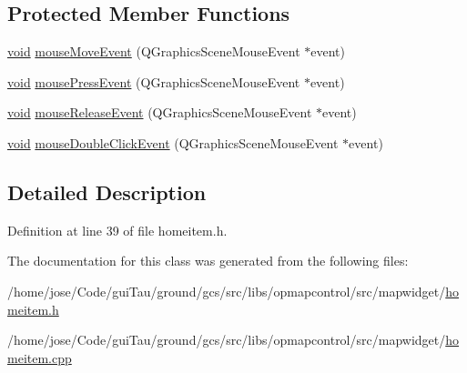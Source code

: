 \subsection*{Protected Member Functions}
\begin{DoxyCompactItemize}
\item 
\hyperlink{group___u_a_v_objects_plugin_ga444cf2ff3f0ecbe028adce838d373f5c}{void} \hyperlink{group___o_p_map_widget_ga547e723911d9f309c53c587dae90002a}{mouse\-Move\-Event} (Q\-Graphics\-Scene\-Mouse\-Event $\ast$event)
\item 
\hyperlink{group___u_a_v_objects_plugin_ga444cf2ff3f0ecbe028adce838d373f5c}{void} \hyperlink{group___o_p_map_widget_ga312ac9d1cba702ca33ba3f6fbc883bb1}{mouse\-Press\-Event} (Q\-Graphics\-Scene\-Mouse\-Event $\ast$event)
\item 
\hyperlink{group___u_a_v_objects_plugin_ga444cf2ff3f0ecbe028adce838d373f5c}{void} \hyperlink{group___o_p_map_widget_gabab0d6bb38eaad0414451df469b7dee2}{mouse\-Release\-Event} (Q\-Graphics\-Scene\-Mouse\-Event $\ast$event)
\item 
\hyperlink{group___u_a_v_objects_plugin_ga444cf2ff3f0ecbe028adce838d373f5c}{void} \hyperlink{group___o_p_map_widget_ga422b8f29836c5a4bafc485a6330408d8}{mouse\-Double\-Click\-Event} (Q\-Graphics\-Scene\-Mouse\-Event $\ast$event)
\end{DoxyCompactItemize}


\subsection{Detailed Description}


Definition at line 39 of file homeitem.\-h.



The documentation for this class was generated from the following files\-:\begin{DoxyCompactItemize}
\item 
/home/jose/\-Code/gui\-Tau/ground/gcs/src/libs/opmapcontrol/src/mapwidget/\hyperlink{homeitem_8h}{homeitem.\-h}\item 
/home/jose/\-Code/gui\-Tau/ground/gcs/src/libs/opmapcontrol/src/mapwidget/\hyperlink{homeitem_8cpp}{homeitem.\-cpp}\end{DoxyCompactItemize}

